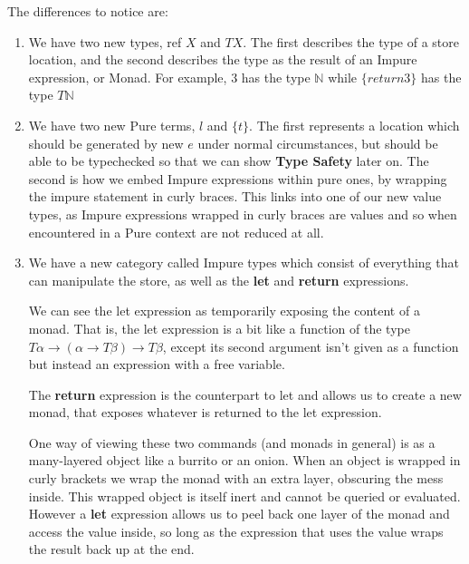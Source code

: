 \documentclass{article}
\begin{document}
The differences to notice are:
\begin{enumerate}
    \item We have two new types, ref $X$ and $TX$. The first describes the type of a store location, and the second describes the type as the result of an Impure expression, or Monad. For example, $3$ has the type $\mathbb{N}$ while $\{return 3\}$ has the type $T\mathbb{N}$
    \item We have two new Pure terms, $l$ and $\{t\}$. The first represents a location which should be generated by new $e$ under normal circumstances, but should be able to be typechecked so that we can show \textbf{Type Safety} later on. The second is how we embed Impure expressions within pure ones, by wrapping the impure statement in curly braces. This links into one of our new value types, as Impure expressions wrapped in curly braces are values and so when encountered in a Pure context are not reduced at all.
    \item We have a new category called Impure types which consist of everything that can manipulate the store, as well as the \textbf{let} and \textbf{return} expressions. 
    
    We can see the let expression as temporarily exposing the content of a monad. That is, the let expression is a bit like a function of the type $T\alpha \to (\alpha \to T \beta) \to T \beta$, except its second argument isn't given as a function but instead an expression with a free variable.
    
    The \textbf{return} expression is the counterpart to let and allows us to create a new monad, that exposes whatever is returned to the let expression. 
    
    One way of viewing these two commands (and monads in general) is as a many-layered object like a burrito or an onion. When an object is wrapped in curly brackets we wrap the monad with an extra layer, obscuring the mess inside. This wrapped object is itself inert and cannot be queried or evaluated. However a \textbf{let} expression allows us to peel back one layer of the monad and access the value inside, so long as the expression that uses the value wraps the result back up at the end. 
\end{enumerate}
\end{document}

